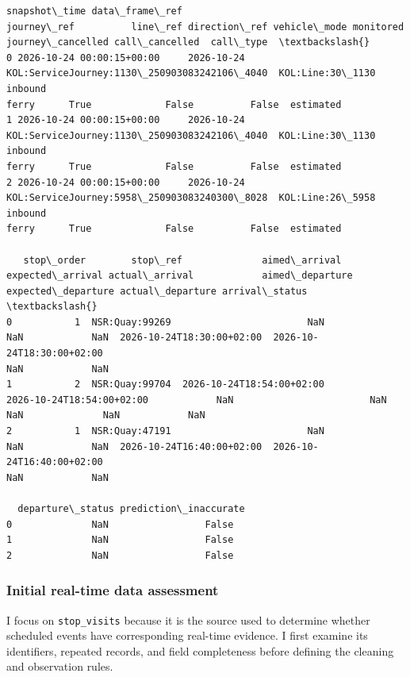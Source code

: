\documentclass[11pt]{article}
\begin{document}
            \begin{tcolorbox}[breakable, size=fbox, boxrule=.5pt, pad at break*=1mm, opacityfill=0]
\begin{Verbatim}[commandchars=\\\{\}]
              snapshot\_time data\_frame\_ref
journey\_ref          line\_ref direction\_ref vehicle\_mode monitored
journey\_cancelled call\_cancelled  call\_type  \textbackslash{}
0 2026-10-24 00:00:15+00:00     2026-10-24
KOL:ServiceJourney:1130\_250903083242106\_4040  KOL:Line:30\_1130       inbound
ferry      True             False          False  estimated
1 2026-10-24 00:00:15+00:00     2026-10-24
KOL:ServiceJourney:1130\_250903083242106\_4040  KOL:Line:30\_1130       inbound
ferry      True             False          False  estimated
2 2026-10-24 00:00:15+00:00     2026-10-24
KOL:ServiceJourney:5958\_250903083240300\_8028  KOL:Line:26\_5958       inbound
ferry      True             False          False  estimated

   stop\_order        stop\_ref              aimed\_arrival
expected\_arrival actual\_arrival            aimed\_departure
expected\_departure actual\_departure arrival\_status  \textbackslash{}
0           1  NSR:Quay:99269                        NaN
NaN            NaN  2026-10-24T18:30:00+02:00  2026-10-24T18:30:00+02:00
NaN            NaN
1           2  NSR:Quay:99704  2026-10-24T18:54:00+02:00
2026-10-24T18:54:00+02:00            NaN                        NaN
NaN              NaN            NaN
2           1  NSR:Quay:47191                        NaN
NaN            NaN  2026-10-24T16:40:00+02:00  2026-10-24T16:40:00+02:00
NaN            NaN

  departure\_status prediction\_inaccurate
0              NaN                 False
1              NaN                 False
2              NaN                 False
\end{Verbatim}
\end{tcolorbox}
        
    \subsubsection{Initial real-time data
assessment}\label{initial-real-time-data-assessment}

I focus on \texttt{stop\_visits} because it is the source used to
determine whether scheduled events have corresponding real-time
evidence. I first examine its identifiers, repeated records, and field
completeness before defining the cleaning and observation rules.
\end{document}
